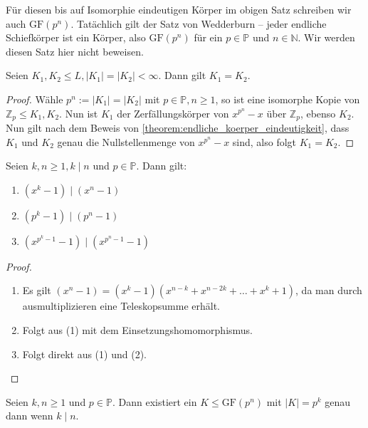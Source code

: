 \begin{remark}
    Für diesen bis auf Isomorphie eindeutigen Körper im obigen Satz schreiben wir auch $\mathrm{GF}(p^n)$. Tatächlich gilt der Satz von Wedderburn -- jeder endliche Schiefkörper ist ein Körper, also $\mathrm{GF}(p^n)$ für ein $p\in\mathbb{P}$ und $n\in\mathbb{N}$. Wir werden diesen Satz hier nicht beweisen. 
\end{remark}

\begin{lemma}
    Seien $K_1, K_2 \leq L, \vert K_1 \vert = \vert K_2 \vert<\infty$. Dann gilt $K_1 = K_2$.
\end{lemma}

\begin{proof}
    Wähle $p^n := \vert K_1 \vert = \vert K_2 \vert$ mit $p \in \mathbb{P}, n \geq 1$, so ist eine isomorphe Kopie von $\mathbb{Z}_p \leq K_1, K_2$. Nun ist $K_1$ der Zerfällungskörper von $x^{p^n} - x$ über $\mathbb{Z}_p$, ebenso $K_2$. Nun gilt nach dem Beweis von \cref{theorem:endliche_koerper_eindeutigkeit}, dass $K_1$ und $K_2$ genau die Nullstellenmenge von $x^{p^n}-x$ sind, also folgt $K_1 = K_2$.
\end{proof}

\begin{lemma}
    Seien $k, n \geq 1, k \mid n$ und $p \in \mathbb{P}$. Dann gilt:
    \begin{enumerate}
        \item $(x^k - 1) \mid (x^n - 1)$
        \item $(p^k - 1) \mid (p^n - 1)$
        \item $(x^{p^k - 1} - 1) \mid (x^{p^n - 1} - 1)$
    \end{enumerate}
\end{lemma}

\begin{proof}{\ }
    \begin{enumerate}
        \item Es gilt $(x^n - 1) = (x^k - 1)(x^{n-k} + x^{n - 2k} + \hdots + x^k + 1)$, da man durch ausmultiplizieren eine Teleskopsumme erhält. 
        \item Folgt aus (1) mit dem Einsetzungshomomorphismus.
        \item Folgt direkt aus (1) und (2).
    \end{enumerate}
\end{proof}


\begin{proposition}\label{proposition:inklusion-von-gf}
    Seien $k, n \geq 1$ und $p \in \mathbb{P}$. Dann existiert ein $K \leq \mathrm{GF}(p^n)$ mit $\vert K \vert = p^k$ genau dann wenn $k \mid n$.
\end{proposition}

